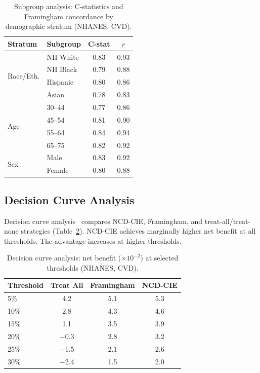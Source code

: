\documentclass[runningheads]{llncs}
\begin{document}
\renewcommand{\arraystretch}{1.2}
\begin{table}[t]
\centering
\caption{Subgroup analysis: C-statistics and Framingham concordance
by demographic stratum (NHANES, CVD).}
\label{tab:subgroup}
\small
\begin{tabular}{@{}llcc@{}}
\toprule
\textbf{Stratum} & \textbf{Subgroup} & \textbf{C-stat} & \textbf{$r$} \\
\midrule
\multirow{4}{*}{Race/Eth.}
  & NH White  & 0.83 & 0.93 \\
  & NH Black  & 0.79 & 0.88 \\
  & Hispanic  & 0.80 & 0.86 \\
  & Asian     & 0.78 & 0.83 \\
\midrule
\multirow{4}{*}{Age}
  & 30--44    & 0.77 & 0.86 \\
  & 45--54    & 0.81 & 0.90 \\
  & 55--64    & 0.84 & 0.94 \\
  & 65--75    & 0.82 & 0.92 \\
\midrule
\multirow{2}{*}{Sex}
  & Male      & 0.83 & 0.92 \\
  & Female    & 0.80 & 0.88 \\
\bottomrule
\end{tabular}
\end{table}
\renewcommand{\arraystretch}{1.0}

\subsection{Decision Curve Analysis}\label{sec:dca}

Decision curve analysis~\cite{vickers2006dca} compares NCD-CIE,
Framingham, and treat-all/treat-none strategies
(Table~\ref{tab:dca}).
NCD-CIE achieves marginally higher net benefit at all thresholds.
The advantage increases at higher thresholds.

\renewcommand{\arraystretch}{1.2}
\begin{table}[t]
\centering
\caption{Decision curve analysis: net benefit ($\times 10^{-2}$) at
selected thresholds (NHANES, CVD).}
\label{tab:dca}
\small
\begin{tabular}{@{}lccc@{}}
\toprule
\textbf{Threshold} & \textbf{Treat All} & \textbf{Framingham} &
\textbf{NCD-CIE} \\
\midrule
5\%  & 4.2 & 5.1 & 5.3 \\
10\% & 2.8 & 4.3 & 4.6 \\
15\% & 1.1 & 3.5 & 3.9 \\
20\% & $-$0.3 & 2.8 & 3.2 \\
25\% & $-$1.5 & 2.1 & 2.6 \\
30\% & $-$2.4 & 1.5 & 2.0 \\
\bottomrule
\end{tabular}
\end{table}
\renewcommand{\arraystretch}{1.0}
\end{document}

